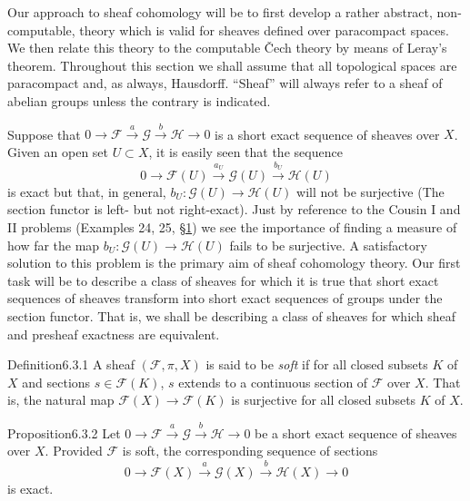 Our approach to sheaf cohomology will be to first develop a rather abstract, non-computable, theory which is valid for sheaves defined over paracompact spaces. We then relate this theory to the computable \v{C}ech theory by means of Leray's theorem.
Throughout this section we shall assume that all topological spaces are paracompact and, as always, Hausdorff. ``Sheaf'' will always refer to a sheaf of abelian groups unless the contrary is indicated.

Suppose that $0\to\mathcal F\xrightarrow a\mathcal G\xrightarrow b\mathcal H\to0$ is a short exact sequence of sheaves over $X$. Given an open set $U\subset X$, it is easily seen that the sequence
\[
0\to\mathcal F(U)\xrightarrow{a_U}\mathcal G(U)\xrightarrow{b_U}\mathcal H(U)
\]
is exact but that, in general, $b_U:\mathcal G(U)\to\mathcal H(U)$ will not be surjective (The section functor is left- but not right-exact). Just by reference to the Cousin I and II problems (Examples 24, 25, \hyperref[sec:6:1]{\S1}) we see the importance of finding a measure of how far the map $b_U:\mathcal G(U)\to\mathcal H(U)$ fails to be surjective. A satisfactory solution to this problem is the primary aim of sheaf cohomology theory. Our first task will be to describe a class of sheaves for which it is true that short exact sequences of sheaves transform into short exact sequences of groups under the section functor. That is, we shall be describing a class of sheaves for which sheaf and presheaf exactness are equivalent.
\begin{originaltheorem}{Definition}{6.3.1}
A sheaf $(\mathcal F,\pi,X)$ is said to be \emph{soft} if for all closed subsets $K$ of $X$ and sections $s\in\mathcal F(K)$, $s$ extends to a continuous section of $\mathcal F$ over $X$. That is, the natural map $\mathcal F(X)\to\mathcal F(K)$ is surjective for all closed subsets $K$ of $X$.
\end{originaltheorem}
\begin{originaltheorem}{Proposition}{6.3.2}
Let $0\to\mathcal F\xrightarrow a\mathcal G\xrightarrow b\mathcal H\to0$ be a short exact sequence of sheaves over $X$. Provided $\mathcal F$ is soft, the corresponding sequence of sections
\[
0\to\mathcal F(X)\xrightarrow a\mathcal G(X)\xrightarrow b\mathcal H(X)\to0
\]
is exact.
\end{originaltheorem}
